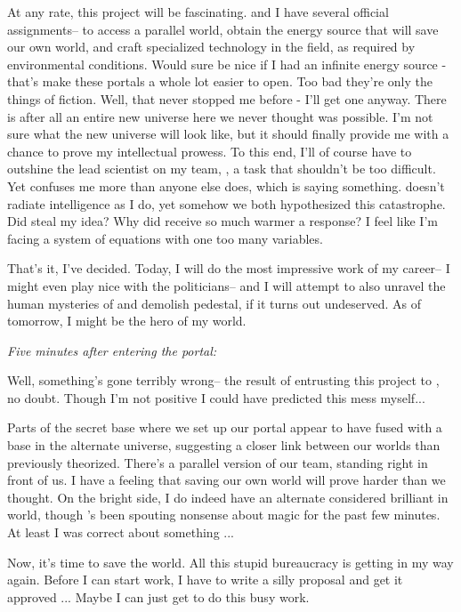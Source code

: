 \documentclass[char]{guildcamp3}
\begin{document}
At any rate, this project will be fascinating. \cSciOne{} and I have several official assignments-- to access a parallel world, obtain the energy source that will save our own world, and craft specialized technology in the field, as required by environmental conditions. Would sure be nice if I had an infinite energy source - that's make these portals a whole lot easier to open. Too bad they're only the things of fiction. Well, that never stopped me before - I'll get one anyway. There is after all an entire new universe here we never thought was possible. I'm not sure what the new universe will look like, but it should finally provide me with a chance to prove my intellectual prowess. To this end, I'll of course have to outshine the lead scientist on my team, \cSciOne{}, a task that shouldn't be too difficult. Yet \cSciOne{\they} confuses me more than anyone else does, which is saying something. \cSciOne{\they} doesn't radiate intelligence as I do, yet somehow we both hypothesized this catastrophe. Did \cSciOne{\they} steal my idea? Why did \cSciOne{\they} receive so much warmer a response? I feel like I'm facing a system of equations with one too many variables.

That's it, I've decided. Today, I will do the most impressive work of my career-- I might even play nice with the politicians-- and I will attempt to also unravel the human mysteries of \cSciOne{} and demolish \cSciOne{\their} pedestal, if it turns out undeserved. As of tomorrow, I might be the hero of my world. 

\emph{Five minutes after entering the portal:}

Well, something's gone terribly wrong-- the result of entrusting this project to \cSciOne{}, no doubt. Though I'm not positive I could have predicted this mess myself...

Parts of the secret base where we set up our portal appear to have fused with a base in the alternate universe, suggesting a closer link between our worlds than previously theorized. There's a parallel version of our team, standing right in front of us. I have a feeling that saving our own world will prove harder than we thought.
On the bright side, I do indeed have an alternate considered brilliant in \cMageOne{\their} world, though \cMageOne{\they}'s been spouting nonsense about magic for the past few minutes. At least I was correct about something ...

Now, it's time to save the world. All this stupid bureaucracy is getting in my way again. Before I can start work, I have to write a silly proposal and get it approved ... Maybe I can just get \cSciOne{} to do this busy work.
\end{document}

